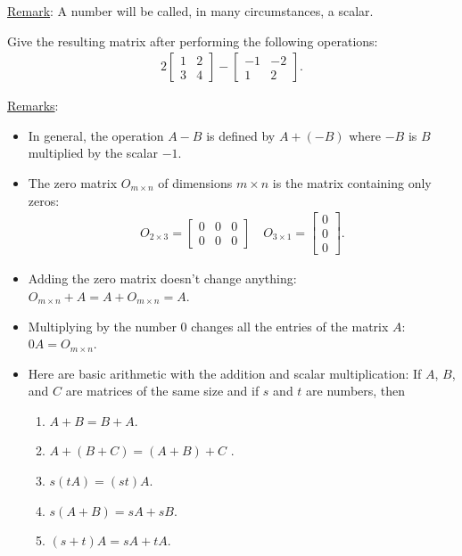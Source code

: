 \documentclass[12pt,a4paper]{article}
\newcounter{example}[section]
\begin{document}
\noindent\underline{Remark}: A number will be called, in many circumstances, a scalar.

\vspace*{16pt}
	
	\begin{example}
	Give the resulting matrix after performing the following operations:
		\begin{align*}
		2 \begin{bmatrix}
		1 & 2 \\ 3 & 4
		\end{bmatrix} - \begin{bmatrix}
		-1 & -2 \\ 1 & 2
		\end{bmatrix} .
		\end{align*}
	\end{example}
	
	\vfill
	
	\noindent\underline{Remarks}:
		\begin{itemize}
		\item In general, the operation $A - B$ is defined by $A + (-B)$ where $-B$ is $B$ multiplied by the scalar $-1$.
		\item The zero matrix $O_{m \times n}$ of dimensions $m \times n$ is the matrix containing only zeros:
			\begin{align*}
			O_{2 \times 3} = \begin{bmatrix}
			0 & 0 & 0 \\ 0 & 0 & 0
			\end{bmatrix}
			\quad O_{3 \times 1} = \begin{bmatrix}
			0 \\ 0 \\ 0
			\end{bmatrix} .
			\end{align*}
		\item Adding the zero matrix doesn't change anything: $O_{m \times n} + A = A + O_{m \times n} = A$.
		\item Multiplying by the number $0$ changes all the entries of the matrix $A$: $0 A = O_{m \times n}$.
		\item Here are basic arithmetic with the addition and scalar multiplication: If $A$, $B$, and $C$ are matrices of the same size and if $s$ and $t$ are numbers, then
		\begin{multicols}{2}
			\begin{enumerate}
			\item $A + B = B + A$.
			\item $A + (B + C) = (A + B) + C$ .
			\item $s (tA) = (st) A$.
			\item $s (A + B) = sA + sB$.
			\item $(s + t) A = sA + tA$.
			\end{enumerate}
		\end{multicols}
	\end{itemize}
\end{document}
